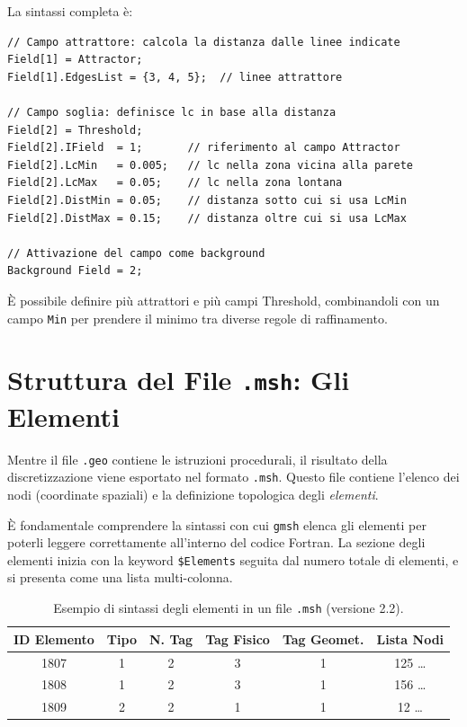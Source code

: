 La sintassi completa è:
\begin{lstlisting}[style=gmsh, caption={Definizione di Attractor e Threshold in \texttt{gmsh}.}]
// Campo attrattore: calcola la distanza dalle linee indicate
Field[1] = Attractor;
Field[1].EdgesList = {3, 4, 5};  // linee attrattore

// Campo soglia: definisce lc in base alla distanza
Field[2] = Threshold;
Field[2].IField  = 1;       // riferimento al campo Attractor
Field[2].LcMin   = 0.005;   // lc nella zona vicina alla parete
Field[2].LcMax   = 0.05;    // lc nella zona lontana
Field[2].DistMin = 0.05;    // distanza sotto cui si usa LcMin
Field[2].DistMax = 0.15;    // distanza oltre cui si usa LcMax

// Attivazione del campo come background
Background Field = 2;
\end{lstlisting}

È possibile definire più attrattori e più campi Threshold, combinandoli con un campo
\texttt{Min} per prendere il minimo tra diverse regole di raffinamento.

\section{Struttura del File \texttt{.msh}: Gli Elementi}

Mentre il file \texttt{.geo} contiene le istruzioni procedurali, il risultato della discretizzazione viene esportato nel formato \texttt{.msh}. Questo file contiene l'elenco dei nodi (coordinate spaziali) e la definizione topologica degli \emph{elementi}. 

È fondamentale comprendere la sintassi con cui \texttt{gmsh} elenca gli elementi per poterli leggere correttamente all'interno del codice Fortran. La sezione degli elementi inizia con la keyword \texttt{\$Elements} seguita dal numero totale di elementi, e si presenta come una lista multi-colonna.

\begin{table}[H]
  \centering
  \caption{Esempio di sintassi degli elementi in un file \texttt{.msh} (versione 2.2).}
  \label{tab:msh_elements}
  \begin{tabular}{cccccc}
    \toprule
    ID Elemento & Tipo & N. Tag & Tag Fisico & Tag Geomet. & Lista Nodi \\
    \midrule
    1807 & 1 & 2 & 3 & 1 & 125 \dots \\
    1808 & 1 & 2 & 3 & 1 & 156 \dots \\
    1809 & 2 & 2 & 1 & 1 & 12 \dots \\
    \bottomrule
  \end{tabular}
\end{table}

